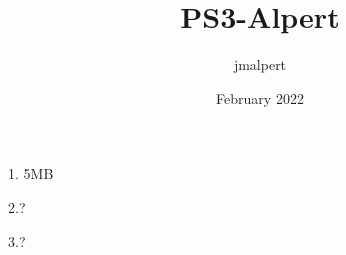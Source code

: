 \documentclass{article}
\title{PS3-Alpert}
\author{jmalpert }
\date{February 2022}
\begin{document}
1. 5MB 
\vspace{2mm}

2.?
\vspace{2mm}

3.?
\end{document}
